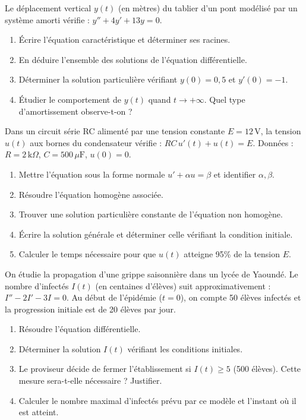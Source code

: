 \documentclass[11pt]{article}
\begin{document}
\begin{exercice}
Le déplacement vertical $y(t)$ (en mètres) du tablier d'un pont modélisé par un système amorti vérifie : $y'' + 4y' + 13y = 0$.
\begin{enumerate}
    \item Écrire l'équation caractéristique et déterminer ses racines.
    \item En déduire l'ensemble des solutions de l'équation différentielle.
    \item Déterminer la solution particulière vérifiant $y(0) = 0,5$ et $y'(0) = -1$.
    \item Étudier le comportement de $y(t)$ quand $t \to +\infty$. Quel type d'amortissement observe-t-on ?
\end{enumerate}
\end{exercice}

\begin{exercice}
Dans un circuit série RC alimenté par une tension constante $E = 12\,\text{V}$, la tension $u(t)$ aux bornes du condensateur vérifie : $RC\, u'(t) + u(t) = E$. Données : $R = 2\,\text{k}\Omega$, $C = 500\,\mu\text{F}$, $u(0) = 0$.
\begin{enumerate}
    \item Mettre l'équation sous la forme normale $u' + \alpha u = \beta$ et identifier $\alpha, \beta$.
    \item Résoudre l'équation homogène associée.
    \item Trouver une solution particulière constante de l'équation non homogène.
    \item Écrire la solution générale et déterminer celle vérifiant la condition initiale.
    \item Calculer le temps nécessaire pour que $u(t)$ atteigne 95\% de la tension $E$.
\end{enumerate}
\end{exercice}

\begin{exercice}
On étudie la propagation d'une grippe saisonnière dans un lycée de Yaoundé. Le nombre d'infectés $I(t)$ (en centaines d'élèves) suit approximativement : $I'' - 2I' - 3I = 0$. Au début de l'épidémie ($t=0$), on compte 50 élèves infectés et la progression initiale est de 20 élèves par jour.
\begin{enumerate}
    \item Résoudre l'équation différentielle.
    \item Déterminer la solution $I(t)$ vérifiant les conditions initiales.
    \item Le proviseur décide de fermer l'établissement si $I(t) \ge 5$ (500 élèves). Cette mesure sera-t-elle nécessaire ? Justifier.
    \item Calculer le nombre maximal d'infectés prévu par ce modèle et l'instant où il est atteint.
\end{enumerate}
\end{exercice}
\end{document}
